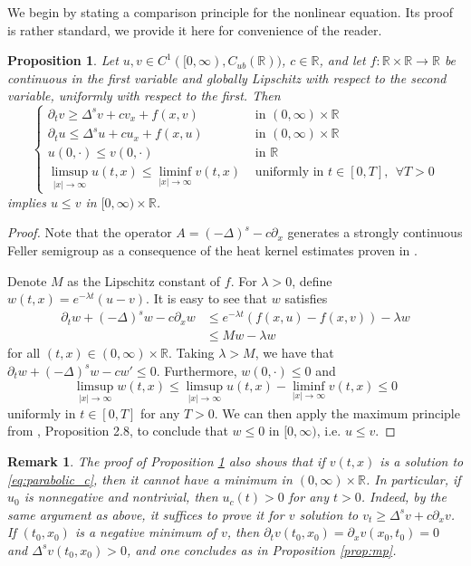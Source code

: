 \documentclass[11pt,a4paper]{amsart}
\newcommand{\R}{\mathbb{R}}
\newtheorem{prop}[thm]{Proposition}
\newtheorem{rmk}{Remark}
\begin{document}
We begin by stating a comparison principle for the nonlinear equation. Its proof is rather standard, we provide it here for convenience of the reader.
\begin{prop}
\label{prop:comparison}
Let $u,v \in C^1([0,\infty), C_{ub}(\R))$, $c\in \R$, and let $f:\R\times \R \rightarrow \R$ be continuous in the first variable and globally Lipschitz with respect to the second variable, uniformly with respect to the first. Then
\[\begin{cases}
\partial_t v\geq \Delta^s v + cv_{x} + f(x,v) & \text{ in } (0,\infty)\times \R\\
\partial_t u \leq \Delta^s u + cu_x + f(x,u)  & \text{ in } (0,\infty)\times \R\\
u(0, \cdot) \leq v(0,\cdot) & \text{ in } \R \\
\displaystyle\limsup_{|x|\rightarrow\infty} u (t,x) \leq \displaystyle\liminf_{|x|\rightarrow \infty} v(t,x)& \text{ uniformly in }t\in[0, T],~~ \forall T> 0
\end{cases}\] 
implies $u\leq v$ in $[0,\infty)\times\R$.
\end{prop}
\begin{proof}
Note that the operator $A = (-\Delta)^s - c\partial_x$ generates a strongly continuous Feller semigroup as a consequence of the heat kernel estimates proven in \cite{BJ07}.

Denote $M$ as the Lipschitz constant of $f$. For $\lambda > 0$, define $w(t,x) = e^{-\lambda t} (u-v)$. It is easy to see that $w$ satisfies
\begin{align*}
\partial_t w + (-\Delta)^s w - c\partial_x w &\leq e^{-\lambda t} (f(x,u) - f(x,v)) - \lambda w \\
&\leq Mw - \lambda w
\end{align*}
for all $(t,x) \in (0,\infty) \times \R$. Taking $\lambda > M$, we have that $\partial_t w +(-\Delta)^sw - cw' \leq 0$. Furthermore, $w(0, \cdot) \leq 0$ and \[\limsup_{|x|\rightarrow\infty} w(t,x) \leq \limsup_{|x|\rightarrow\infty} u(t,x) - \liminf_{|x|\rightarrow\infty} v(t,x) \leq 0\]
uniformly in $t\in [0, T]$ for any $T>0$. We can then apply the maximum principle from \cite{CR13}, Proposition 2.8, to conclude that $w\leq 0$ in $[0,\infty)$, i.e. $u\leq v$.
\end{proof}

\begin{rmk}
\label{rmk:parabolic_smp}
The proof of Proposition \ref{prop:comparison} also shows that if $v(t,x)$ is a solution to \eqref{eq:parabolic_c}, then it cannot have a minimum in $(0,\infty)\times \R$. In particular, if $u_0$ is nonnegative and nontrivial, then $u_c(t) > 0$ for any $t>0$. Indeed, by the same argument as above, it suffices to prove it for $v$ solution to $v_t \geq \Delta^s v +c \partial_x v$. If $(t_0,x_0)$ is a negative minimum of $v$, then $\partial_t v(t_0, x_0) = \partial_x v(x_0,t_0) = 0$ and $\Delta^s v(t_0, x_0) > 0$, and one concludes as in Proposition \ref{prop:mp}.  
\end{rmk}
\end{document}
